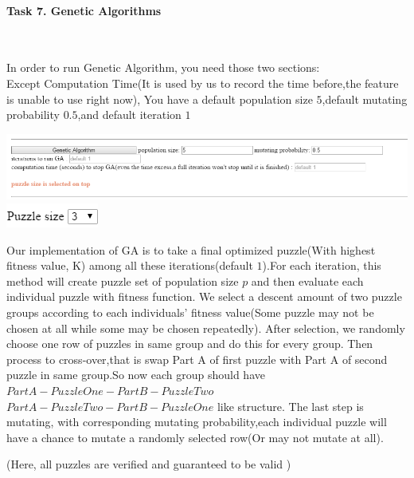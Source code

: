 \documentclass[12pt, letterpaper]{article}
\begin{document}
\pagebreak
\paragraph{Task 7. Genetic Algorithms} \mbox{}\\

	\begin{large}
		In order to run Genetic Algorithm, you need those two sections:\\
		Except Computation Time(It is used by us to record the time before,the feature is unable to use right now), You have a default population size $5$,default mutating probability $0.5$,and default iteration $1$ \\
	\end{large} 
	
	\includegraphics[scale=0.6]{"Task 7/GA-section"}
	\includegraphics[scale=0.6]{"Task 7/Puzzle-size"}\\
	
	\begin{large}
		Our implementation of GA is to take a final optimized puzzle(With highest fitness value, K) among all these iterations(default $1$).For each iteration, this method will create puzzle set of population size  $p$ and then evaluate each individual puzzle with fitness function. We select a descent amount of two puzzle groups according to each individuals' fitness value(Some puzzle may not be chosen at all while some may be chosen repeatedly). After selection, we randomly choose one row of puzzles in same group and do this for every group. Then process to cross-over,that is swap Part A of first puzzle with Part A of second puzzle in same group.So now each group should have $PartA-PuzzleOne-PartB-PuzzleTwo$ $PartA-PuzzleTwo-PartB-PuzzleOne$ like structure. The last step is mutating, with corresponding mutating probability,each individual puzzle will have a chance to mutate a randomly selected row(Or may not mutate at all).
	\end{large}
	
	
	(Here, all puzzles are verified and guaranteed to be valid )\\
	
\end{document}
